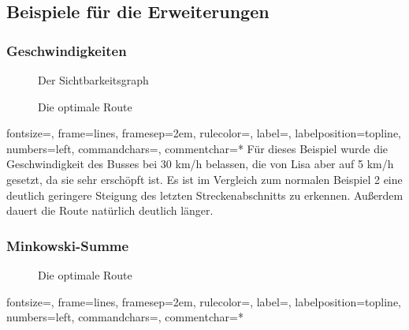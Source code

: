 \documentclass[a4paper, notitlepage, 12pt]{scrartcl}
\begin{document}
\subsection{Beispiele für die Erweiterungen}
\subsubsection*{Geschwindigkeiten}
\begin{minipage}[b]{0.45\linewidth}
	\begin{figure}[H]
		
		\caption{Der Sichtbarkeitsgraph}
	\end{figure}
\end{minipage}
\hspace{0.5cm}
\begin{minipage}[b]{0.45\linewidth}
	\begin{figure}[H] 
		\caption{Die optimale Route}
	\end{figure}
\end{minipage}
%
{fontsize=\footnotesize,
	frame=lines,  %
	framesep=2em, %
	rulecolor=\color{Gray},
	label=,
	labelposition=topline,
	numbers=left,
	commandchars=\|\(\), %
	commentchar=*        %
}
Für dieses Beispiel wurde die Geschwindigkeit des Busses bei 30 km/h belassen, die von Lisa aber auf 5 km/h gesetzt, da sie sehr erschöpft ist. Es ist im Vergleich zum normalen Beispiel 2 eine deutlich geringere Steigung des letzten Streckenabschnitts zu erkennen. Außerdem dauert die Route natürlich deutlich länger.
\subsubsection*{Minkowski-Summe}
\begin{figure}[H] 
	\caption{Die optimale Route}
\end{figure}
%
{fontsize=\footnotesize,
	frame=lines,  %
	framesep=2em, %
	rulecolor=\color{Gray},
	label=,
	labelposition=topline,
	numbers=left,
	commandchars=\|\(\), %
	commentchar=*        %
}
\newpage
\end{document}
